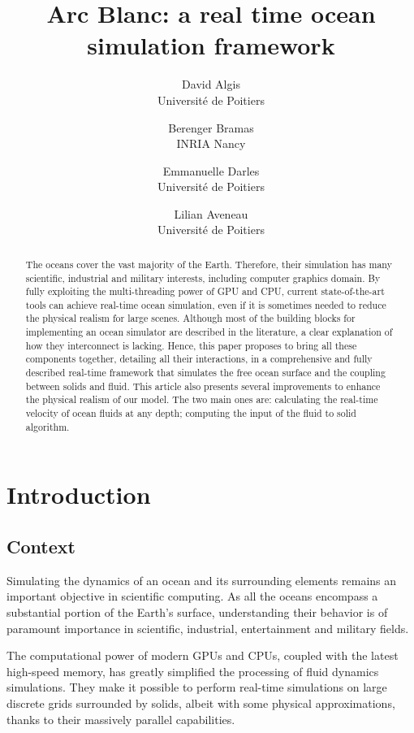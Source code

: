 \documentclass[final]{jcgt}
\title{Arc Blanc: a real time ocean simulation framework}
\author{%
    David Algis\\Université de Poitiers%
    \and Berenger Bramas\\INRIA Nancy
    \and Emmanuelle Darles\\Université de Poitiers%
    \and Lilian Aveneau\\Université de Poitiers%
}
\begin{document}
\thispagestyle{firstpagestyle}

\maketitle

\begin{abstract}
	\small
	The oceans cover the vast majority of the Earth.
	Therefore, their simulation has many scientific, industrial and military interests, including computer graphics domain.
	By fully exploiting the multi-threading power of GPU and CPU, current state-of-the-art tools can achieve real-time ocean simulation, even if it is sometimes needed to reduce the physical realism for large scenes.
	Although most of the building blocks for implementing an ocean simulator are described in the literature, a clear explanation of how they interconnect is lacking.
	Hence, this paper proposes to bring all these components together, detailing all their interactions, in a comprehensive and fully described real-time framework that simulates the free ocean surface and the coupling between solids and fluid.
	This article also presents several improvements to enhance the physical realism of our model. 
	The two main ones are: 
	calculating the real-time velocity of ocean fluids at any depth; 
	computing the input of the fluid to solid algorithm.
\end{abstract}

\section{Introduction}
\label{sec:introduction}

\subsection{Context}
\label{subsec:intro-context}
Simulating the dynamics of an ocean and its surrounding elements remains an important objective in scientific computing.
As all the oceans encompass a substantial portion of the Earth's surface, understanding their behavior is of paramount importance in scientific, industrial, entertainment and military fields.

The computational power of modern GPUs and CPUs, coupled with the latest high-speed memory, has greatly simplified the processing of fluid dynamics simulations.
They make it possible to perform real-time simulations on large discrete grids surrounded by solids, albeit with some physical approximations, thanks to their massively parallel capabilities.
\end{document}
